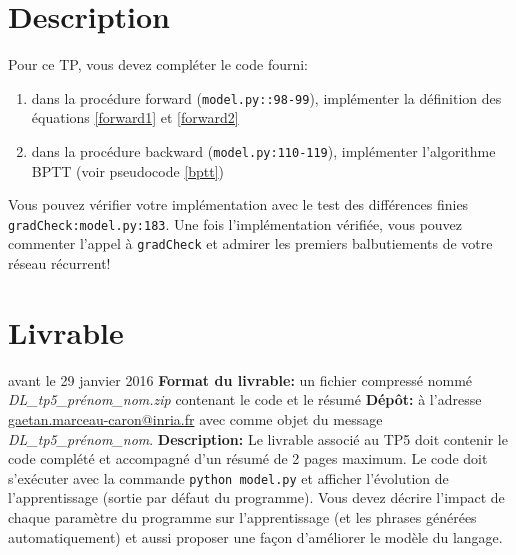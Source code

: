 \documentclass{article}
\begin{document}
\section{Description}
Pour ce TP, vous devez compléter le code fourni:
\begin{enumerate}
\item dans la procédure forward (\texttt{model.py::98-99}), implémenter la définition des équations \ref{forward1} et \ref{forward2}
\item dans la procédure backward (\texttt{model.py:110-119}), implémenter l'algorithme BPTT (voir pseudocode \ref{bptt})
\end{enumerate}
Vous pouvez vérifier votre implémentation avec le test des différences finies \texttt{gradCheck:model.py:183}.
Une fois l'implémentation vérifiée, vous pouvez commenter l'appel à \texttt{gradCheck} et admirer les premiers balbutiements de votre réseau récurrent!

\section{Livrable}
 avant le 29 janvier 2016 \newline
{\bf Format du livrable:} un fichier compressé nommé {\it DL\_tp5\_prénom\_nom.zip} contenant le code et le résumé \newline
{\bf Dépôt:} à l'adresse \url{gaetan.marceau-caron@inria.fr} avec comme objet du message {\it DL\_tp5\_prénom\_nom}.\newline
{\bf Description:}\newline
Le livrable associé au TP5 doit contenir le code complété et accompagné d'un résumé de 2 pages maximum.
Le code doit s'exécuter avec la commande \texttt{python model.py} et afficher l'évolution de l'apprentissage (sortie par défaut du programme).
Vous devez décrire l'impact de chaque paramètre du programme sur l'apprentissage (et les phrases générées automatiquement) et aussi proposer une façon d'améliorer le modèle du langage.

\printbibliography
\end{document}
